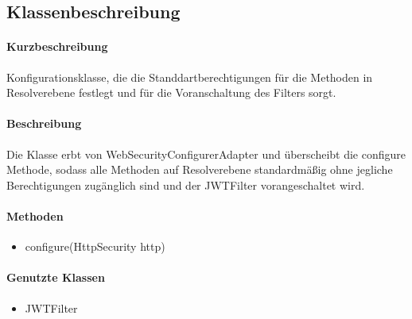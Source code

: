 \subsection{Klassenbeschreibung}%
\paragraph*{Kurzbeschreibung}
Konfigurationsklasse, die die Standdartberechtigungen für die Methoden in Resolverebene festlegt und für die Voranschaltung des Filters sorgt.
\paragraph*{Beschreibung}
Die Klasse erbt von \dq WebSecurityConfigurerAdapter \dq und überscheibt die \dq configure \dq Methode, sodass 
alle Methoden auf Resolverebene standardmäßig ohne jegliche Berechtigungen zugänglich sind und der JWTFilter vorangeschaltet wird.
\paragraph*{Methoden}
\begin{itemize}
	\item configure(HttpSecurity http)
\end{itemize}	
\paragraph*{Genutzte Klassen}
\begin{itemize}
	\item JWTFilter
\end{itemize}	